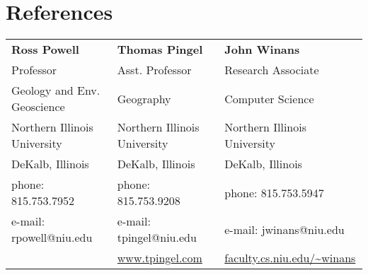 \documentclass{cv_TOH}
\begin{document}
\section{References}
\begin{tabular}{@{}p{6cm}p{6cm}p{6cm}}
\textbf{Ross Powell}                  &  \textbf{Thomas Pingel}            & \textbf{John Winans}   \\
Professor                             &  Asst. Professor                   &  Research Associate    \\
Geology and Env. Geoscience           &  Geography                         &  Computer Science      \\
Northern Illinois University          &  Northern Illinois University      &  Northern Illinois University \\
DeKalb, Illinois                      &  DeKalb, Illinois                  &  DeKalb, Illinois  \\
phone: 815.753.7952                   &  phone: 815.753.9208               &  phone: 815.753.5947  \\
e-mail: rpowell@niu.edu               &  e-mail: tpingel@niu.edu           &  e-mail: jwinans@niu.edu   \\
                                      &  \url{www.tpingel.com}             &  \url{faculty.cs.niu.edu/~winans} \\
\end{tabular}
\end{document}
